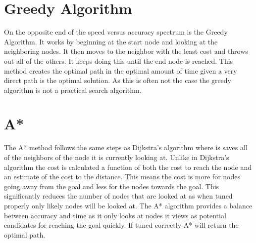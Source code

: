 \section{Greedy Algorithm}
On the opposite end of the speed versus accuracy spectrum is the Greedy Algorithm. It works by beginning at the start node and looking at the neighboring nodes. It then moves to the neighbor with the least cost and throws out all of the others. It keeps doing this until the end node is reached. This method creates the optimal path in the optimal amount of time given a very direct path is the optimal solution.  As this is often not the case the greedy algorithm is not a practical search algorithm.

\section{A*}
The A* method follows the same steps as Dijkstra's algorithm where is saves all of the neighbors of the node it is currently looking at. Unlike in Dijkstra's algorithm the cost is calculated a function of both the cost to reach the node and an estimate of the cost to the distance. This means the cost is more for nodes going away from the goal and less for the nodes towards the goal. This significantly reduces the number of nodes that are looked at as when tuned properly only likely nodes will be looked at. The A* algorithm provides a balance between accuracy and time as it only looks at nodes it views as potential candidates for reaching the goal quickly. If tuned correctly A* will return the optimal path. 